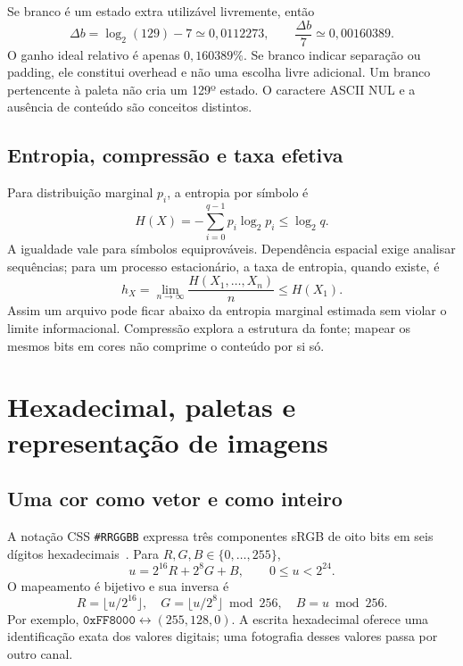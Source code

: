 \documentclass[11pt,a4paper]{article}
\begin{document}
Se branco é um estado extra utilizável livremente, então
\begin{equation}
\Delta b=\log_2(129)-7\simeq0,0112273,\qquad
\frac{\Delta b}{7}\simeq0,00160389.
\end{equation}
O ganho ideal relativo é apenas $0,160389\%$. Se branco indicar separação ou padding, ele constitui overhead e não uma escolha livre adicional. Um branco pertencente à paleta não cria um 129º estado. O caractere ASCII NUL e a ausência de conteúdo são conceitos distintos.

\subsection{Entropia, compressão e taxa efetiva}
Para distribuição marginal $p_i$, a entropia por símbolo é
\begin{equation}
H(X)=-\sum_{i=0}^{q-1}p_i\log_2p_i\le\log_2q.
\end{equation}
A igualdade vale para símbolos equiprováveis. Dependência espacial exige analisar sequências; para um processo estacionário, a taxa de entropia, quando existe, é
\begin{equation}
h_X=\lim_{n\to\infty}\frac{H(X_1,\ldots,X_n)}{n}\le H(X_1).
\end{equation}
Assim um arquivo pode ficar abaixo da entropia marginal estimada sem violar o limite informacional. Compressão explora a estrutura da fonte; mapear os mesmos bits em cores não comprime o conteúdo por si só.

\section{Hexadecimal, paletas e representação de imagens}
\subsection{Uma cor como vetor e como inteiro}
A notação CSS \texttt{\#RRGGBB} expressa três componentes sRGB de oito bits em seis dígitos hexadecimais~\cite{2026w3cColor}. Para $R,G,B\in\{0,\ldots,255\}$,
\begin{equation}\label{eq:hex}
u=2^{16}R+2^8G+B,\qquad0\le u<2^{24}.
\end{equation}
O mapeamento é bijetivo e sua inversa é
\begin{equation}
R=\lfloor u/2^{16}\rfloor,\quad
G=\lfloor u/2^8\rfloor\bmod256,\quad B=u\bmod256.
\end{equation}
Por exemplo, $\texttt{0xFF8000}\leftrightarrow(255,128,0)$. A escrita hexadecimal oferece uma identificação exata dos valores digitais; uma fotografia desses valores passa por outro canal.
\end{document}
